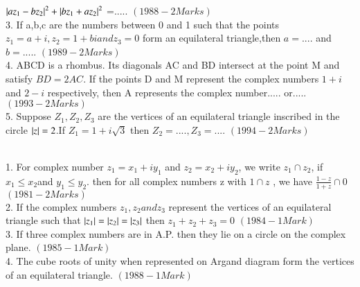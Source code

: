 \documentclass[journal,12pt,twocolumn]{IEEEtran}
\theoremstyle{remark}
\begin{document}
$\left\vert az_1-bz_2\right\vert^2+\left\vert bz_1+az_2\right\vert^2$ =.....  \hfill$(1988 - 2 Marks)$\\
3.  If a,b,c are the numbers between 0 and 1 such that the points $z_1=a+i, z_2=1+bi andz_3=0$ form an equilateral triangle,then $a=....$ and $b=.....$ \hfill$(1989 - 2 Marks)$\\
4.  ABCD is a rhombus. Its diagonals AC and BD intersect at the point M and satisfy $BD=2AC$. If the points D and M represent the complex numbers $1+i$ and $2-i$ respectively, then A represents the complex number..... or..... \hfill$(1993 - 2 Marks)$\\
5.  Suppose $Z_1,Z_2,Z_3$ are the vertices of an equilateral triangle inscribed in the circle $\left\vert z\right\vert=2$.If $Z_1=1+i\sqrt{3}$ then $Z_2=....,Z_3=.... $ \hfill$(1994 - 2 Marks)$\\
\\
1.  For complex number $z_1=x_1+iy_1 $ and $z_2=x_2+iy_2$, we write $z_1\cap z_2$, if $x_1\leq x_2 $and $y_1\leq y_2. $ then for all complex numbers z with $1\cap z$ , we have $\frac{1-z}{1+z} \cap 0$  \hfill$(1981 - 2 Marks)$\\
2.  If the complex numbers $z_1,z_2  and z_3 $ represent the vertices of an equilateral triangle such that $ \left\vert z_1\right\vert = \left\vert z_2\right\vert=\left\vert z_3\right\vert $ then $z_1+z_2+z_3 = 0$ \hfill$(1984 - 1 Mark)$\\
3.  If three complex numbers are in A.P. then they lie on a circle on the complex plane. \hfill$(1985 - 1 Mark)$\\
4.  The cube roots of unity when represented on Argand diagram form the vertices of an equilateral triangle. \hfill$(1988 - 1 Mark)$\\
\\
\end{document}
